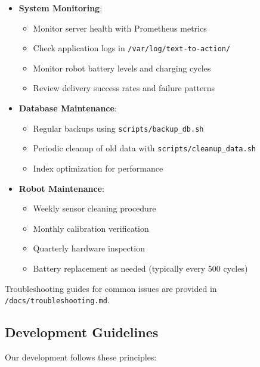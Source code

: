 \documentclass[12pt]{article}
\begin{document}
\begin{itemize}
    \item \textbf{System Monitoring}:
    \begin{itemize}
        \item Monitor server health with Prometheus metrics
        \item Check application logs in \texttt{/var/log/text-to-action/}
        \item Monitor robot battery levels and charging cycles
        \item Review delivery success rates and failure patterns
    \end{itemize}
    
    \item \textbf{Database Maintenance}:
    \begin{itemize}
        \item Regular backups using \texttt{scripts/backup\_db.sh}
        \item Periodic cleanup of old data with \texttt{scripts/cleanup\_data.sh}
        \item Index optimization for performance
    \end{itemize}
    
    \item \textbf{Robot Maintenance}:
    \begin{itemize}
        \item Weekly sensor cleaning procedure
        \item Monthly calibration verification
        \item Quarterly hardware inspection
        \item Battery replacement as needed (typically every 500 cycles)
    \end{itemize}
\end{itemize}

Troubleshooting guides for common issues are provided in \texttt{/docs/troubleshooting.md}.

\subsection{Development Guidelines}

Our development follows these principles:
\end{document}
